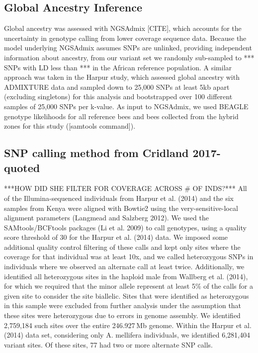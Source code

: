 \documentclass[12pt]{report}
\begin{document}
\subsection{Global Ancestry Inference}

Global ancestry was assessed with NGSAdmix [CITE], which accounts for the uncertainty in genotype calling from lower coverage sequence data. Because the model underlying NGSAdmix assumes SNPs are unlinked, providing independent information about ancestry, from our variant set we randomly sub-sampled to *** SNPs with LD less than *** in the African reference population. A similar approach was taken in the Harpur study, which assessed global ancestry with ADMIXTURE data and sampled down to 25,000 SNPs at least 5kb apart (excluding singletons) for this analysis and bootstrapped over 100 different samples of 25,000 SNPs per k-value. As input to NGSAdmix, we used BEAGLE genotype likelihoods for all reference bees and bees collected from the hybrid zones for this study ([samtools command]).
\subsection{SNP calling method from Cridland 2017-quoted}
***HOW DID SHE FILTER FOR COVERAGE ACROSS \# OF INDS?***
All of the Illumina-sequenced individuals from Harpur et al. (2014) and the six samples from Kenya were aligned with Bowtie2 using the very-sensitive-local alignment parameters (Langmead and Salzberg 2012).
We used the SAMtools/BCFtools packages (Li et al. 2009) to call genotypes, using a quality score threshold of 30 for the Harpur et al. (2014) data. We imposed some additional quality control filtering of these calls and kept only sites where the coverage for that individual was at least 10x, and we called heterozygous SNPs in individuals where we observed an alternate call at least twice. 
Additionally, we identified all heterozygous sites in the haploid male from Wallberg et al. (2014), for which we required that the minor allele represent at least 5\% of the calls for a given site to consider the site biallelic. Sites that were identified as heterozygous in this sample were excluded from further analysis under the assumption that these sites were heterozygous due to errors in genome assembly. We identified 2,759,184 such sites over the entire 246.927 Mb genome.
Within the Harpur et al. (2014) data set, considering only A. mellifera individuals, we identified 6,281,404 variant sites. Of these sites, 77 had two or more alternate SNP calls.
\end{document}

